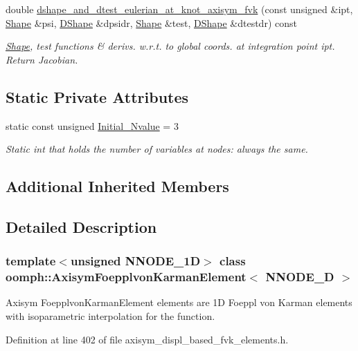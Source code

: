 \begin{DoxyCompactItemize}
double \hyperlink{classoomph_1_1AxisymFoepplvonKarmanElement_a20841d263ec4590d5614d43f2f813ae7}{dshape\+\_\+and\+\_\+dtest\+\_\+eulerian\+\_\+at\+\_\+knot\+\_\+axisym\+\_\+fvk} (const unsigned \&ipt, \hyperlink{classoomph_1_1Shape}{Shape} \&psi, \hyperlink{classoomph_1_1DShape}{D\+Shape} \&dpsidr, \hyperlink{classoomph_1_1Shape}{Shape} \&test, \hyperlink{classoomph_1_1DShape}{D\+Shape} \&dtestdr) const
\begin{DoxyCompactList}\small\item\em \hyperlink{classoomph_1_1Shape}{Shape}, test functions \& derivs. w.\+r.\+t. to global coords. at integration point ipt. Return Jacobian. \end{DoxyCompactList}\end{DoxyCompactItemize}
\subsection*{Static Private Attributes}
\begin{DoxyCompactItemize}
\item 
static const unsigned \hyperlink{classoomph_1_1AxisymFoepplvonKarmanElement_a881cfa4e7a54d746002871a99337eae8}{Initial\+\_\+\+Nvalue} = 3
\begin{DoxyCompactList}\small\item\em Static int that holds the number of variables at nodes\+: always the same. \end{DoxyCompactList}\end{DoxyCompactItemize}
\subsection*{Additional Inherited Members}


\subsection{Detailed Description}
\subsubsection*{template$<$unsigned N\+N\+O\+D\+E\+\_\+1D$>$\newline
class oomph\+::\+Axisym\+Foepplvon\+Karman\+Element$<$ N\+N\+O\+D\+E\+\_\+D $>$}

Axisym Foepplvon\+Karman\+Element elements are 1D Foeppl von Karman elements with isoparametric interpolation for the function. 

Definition at line 402 of file axisym\+\_\+displ\+\_\+based\+\_\+fvk\+\_\+elements.\+h.



